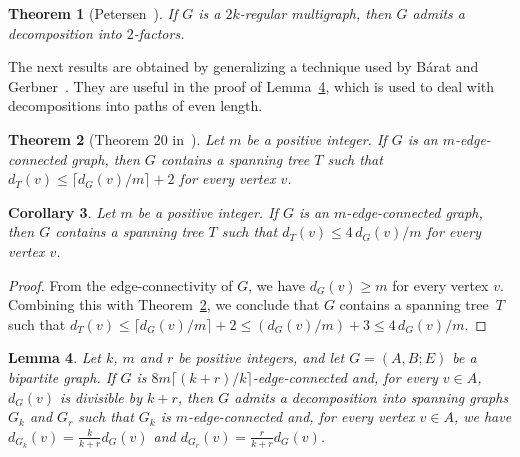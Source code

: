 \documentclass[12pt,reqno,a4paper]{amsart}
\newcommand{\azul}[1]{\textcolor{blue}{#1}}
\newtheorem{theorem}{Theorem}[section]
\newtheorem{lemma}[theorem]{Lemma}
\newtheorem{corollary}[theorem]{Corollary}
\begin{document}

\begin{theorem}[Petersen~\cite{Pe1891}]\label{thm:Petersen}
	If \(G\) is a \(2k\)-regular multigraph,
	then \(G\) admits a decomposition into \(2\)-factors.
\end{theorem}


The next results are obtained by generalizing a technique used
  by Bárat and Gerbner~\cite{BaGe14}.  They are useful in the proof of
  Lemma~\ref{lem:barat-part-3}, which is used to deal with
  decompositions into paths of even length.

\begin{theorem}[Theorem 20 in~\cite{ElNaVo02}]\label{thm:elnavo02}
  Let $m$ be a positive integer. If \(G\)
  is an \(m\)-edge-connected
  graph, then \(G\) contains a spanning tree \(T\) such that
\(d_T(v) \leq  \lceil d_G(v)/m\rceil + 2\) for every vertex \(v\).
\end{theorem}

\begin{corollary}\label{cor:razao}
   Let $m$ be a positive integer. If \(G\)
  is an \(m\)-edge-connected
  graph, then \(G\)
  contains a spanning tree \(T\)
  such that \(d_T(v) \leq 4\,d_G(v)/m\) for every vertex \(v\).
\end{corollary}

\begin{proof}
   From the edge-connectivity of $G$, we have
  \(d_G(v) \geq m\)
  for every vertex \(v\).
  Combining this with Theorem~\ref{thm:elnavo02}, we conclude
    that $G$ contains a spanning tree~$T$ such that
    $d_T(v) \leq \lceil d_G(v)/m\rceil + 2 \leq (d_G(v)/m)+3 \leq
    4\,d_G(v)/m$.
\end{proof}



\begin{lemma}\label{lem:barat-part-3}
Let $k$, $m$ and $r$ be positive integers,  and let $G=(A,B;E)$ be a 
bipartite graph. If $G$ is $8m\lceil(k+r)/k\rceil$-edge-connected and, for 
every 
$v\in A$, \(d_G(v)\) is divisible by \(k+r\), then 
\(G\) 
admits a decomposition into spanning graphs \(G_k\) and \(G_r\) such that \(G_k\) is 
\hbox{\(m\)-edge-connected} and, for every vertex  $v\in 
A$, we have \(d_{G_k}(v) = \frac{k}{k+r}d_G(v)\) and \(d_{G_r}(v) = 
\frac{r}{k+r}d_G(v)\).
\end{lemma}
\end{document}
